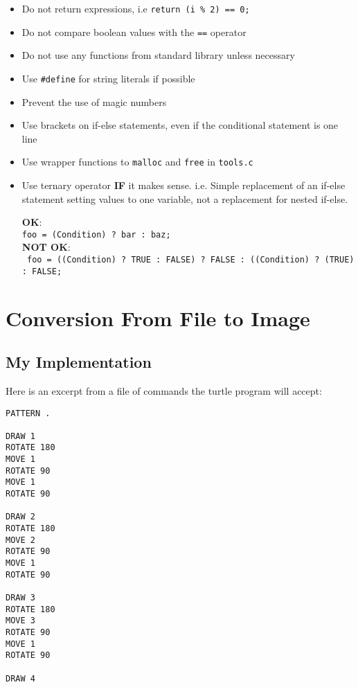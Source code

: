 \documentclass[a4paper, 12pt, titlepage]{article}
\newcommand{\code}[1]{\small\texttt{#1}\normalsize}
\begin{document}
\begin{itemize}[label={--}]
    \item Do not return expressions, i.e \code{return (i \% 2) == 0;}
    \item Do not compare boolean values with the \code{==} operator
    \item Do not use any functions from standard library unless necessary
    \item Use \code{\#define} for string literals if possible
    \item Prevent the use of magic numbers
    \item Use brackets on if-else statements, even if the conditional
          statement is one line
    \item Use wrapper functions to \code{malloc} and \code{free} in
          \code{tools.c}
    \item Use ternary operator \textbf{IF} it makes sense. i.e. Simple
          replacement of an if-else statement setting values to one variable,
          not a replacement for nested if-else.

          \textbf{OK}:
          \\\code{foo = (Condition) ? bar : baz;}\\
          \textbf{NOT OK}:
          \\\code{
              foo = ((Condition) ? TRUE : FALSE) ? FALSE :
              ((Condition) ? (TRUE) : FALSE;
          }
\end{itemize}

\newpage


\section{Conversion From File to Image}

\subsection{My Implementation}

Here is an excerpt from a file of commands the turtle program will accept:

\begin{lstlisting}
PATTERN .

DRAW 1
ROTATE 180
MOVE 1
ROTATE 90
MOVE 1
ROTATE 90

DRAW 2
ROTATE 180
MOVE 2
ROTATE 90
MOVE 1
ROTATE 90

DRAW 3
ROTATE 180
MOVE 3
ROTATE 90
MOVE 1
ROTATE 90

DRAW 4
\end{lstlisting}
\end{document}
